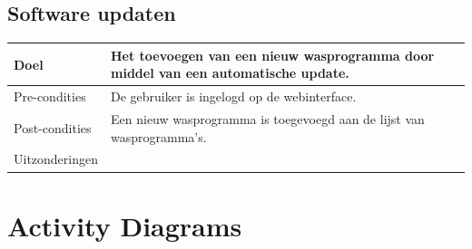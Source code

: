 \subsection{Software updaten}
\begin{center}
  \begin{tabular}{ | p{4cm} | p{8.5cm} | }    \hline
    Doel & Het toevoegen van een nieuw wasprogramma door middel van een automatische update. \\ \hline
    Pre-condities & De gebruiker is ingelogd op de webinterface. \\ \hline
    Post-condities & Een nieuw wasprogramma is toegevoegd aan de lijst van wasprogramma's. \\ \hline
    Uitzonderingen & \\
    \hline
  \end{tabular}
\end{center}

\section{Activity Diagrams}
